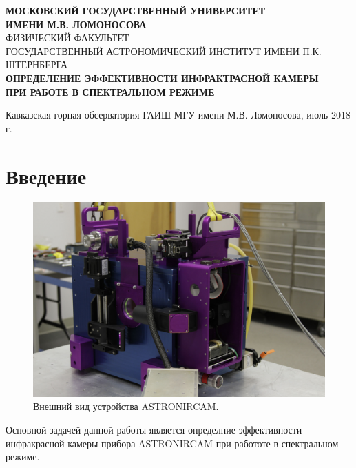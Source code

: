 \documentclass[a4paper]{article}
\begin{document}
\setcounter{page}{0} 
\begin{titlepage}
\begin{center}
\large{\textbf{МОСКОВСКИЙ ГОСУДАРСТВЕННЫЙ УНИВЕРСИТЕТ\\ИМЕНИ М.В. ЛОМОНОСОВА}}\\
\hfill\break
\normalsize{ФИЗИЧЕСКИЙ ФАКУЛЬТЕТ}\\
\hfill\break
\normalsize{ГОСУДАРСТВЕННЫЙ АСТРОНОМИЧЕСКИЙ ИНСТИТУТ ИМЕНИ П.К. ШТЕРНБЕРГА}\\
\hfill\break
\hfill\break
\hfill\break
\hfill\break
\hfill\break
\hfill\break
\hfill\break
\hfill\break
\hfill\break
\hfill\break
\Large{\textbf{ОПРЕДЕЛЕНИЕ ЭФФЕКТИВНОСТИ ИНФРАКТРАСНОЙ КАМЕРЫ\\ПРИ РАБОТЕ В СПЕКТРАЛЬНОМ РЕЖИМЕ}}\\
\hfill\break
\hfill\break
\end{center}
\hfill\break
\hfill\break
\hfill\break
\hfill\break
\hfill\break
\hfill\break
\hfill\break
\hfill\break
\hfill\break
\hfill\break
\hfill\break
\hfill\break
\hfill\break
\hfill\break
\hfill\break
\hfill\break 
\hfill\break
\hfill\break
\hfill\break
\begin{center}
Кавказская горная обсерватория ГАИШ МГУ имени М.В. Ломоносова, июль 2018 г.
\end{center}
\thispagestyle{empty}
\end{titlepage}
\newpage
\tableofcontents
\newpage
\section{Введение}
\begin{figure} 
\vspace{-4ex}
\includegraphics[width=\linewidth]{11}
\caption{Внешний вид устройства ASTRONIRCAM.}
\label{fig:1}
\end{figure}
Основной задачей данной работы является определние эффективности инфракрасной камеры прибора ASTRONIRCAM при работоте в спектральном режиме.
\end{document}
